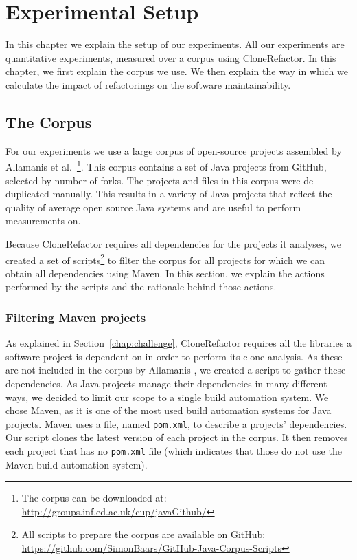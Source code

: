 \chapter{Experimental Setup}\label{ch:experimentalsetup}
In this chapter we explain the setup of our experiments. All our experiments are quantitative experiments, measured over a corpus using CloneRefactor. In this chapter, we first explain the corpus we use. We then explain the way in which we calculate the impact of refactorings on the software maintainability.

\section{The Corpus}\label{chap:corpus}
For our experiments we use a large corpus of open-source projects assembled by Allamanis et al.~\cite{githubCorpus2013}\footnote{The corpus can be downloaded at: \url{http://groups.inf.ed.ac.uk/cup/javaGithub/}}. This corpus contains a set of Java projects from GitHub, selected by number of forks. The projects and files in this corpus were de-duplicated manually. This results in a variety of Java projects that reflect the quality of average open source Java systems and are useful to perform measurements on.

Because CloneRefactor requires all dependencies for the projects it analyses, we created a set of scripts\footnote{All scripts to prepare the corpus are available on GitHub: \url{https://github.com/SimonBaars/GitHub-Java-Corpus-Scripts}} to filter the corpus for all projects for which we can obtain all dependencies using Maven. In this section, we explain the actions performed by the scripts and the rationale behind those actions.

\subsection{Filtering Maven projects}
As explained in Section~\ref{chap:challenge}, CloneRefactor requires all the libraries a software project is dependent on in order to perform its clone analysis. As these are not included in the corpus by Allamanis \cite{githubCorpus2013}, we created a script to gather these dependencies. As Java projects manage their dependencies in many different ways, we decided to limit our scope to a single build automation system. We chose Maven, as it is one of the most used build automation systems for Java projects. Maven uses a file, named \texttt{pom.xml}, to describe a projects' dependencies. Our script clones the latest version of each project in the corpus. It then removes each project that has no \texttt{pom.xml} file (which indicates that those do not use the Maven build automation system).

